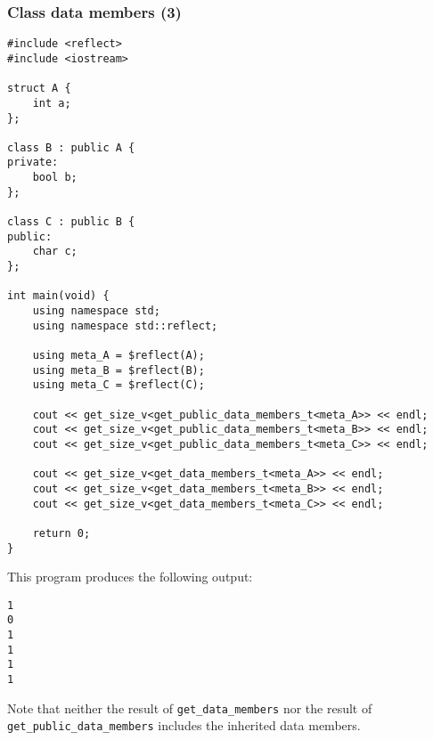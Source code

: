 \subsubsection{Class data members (3)}

\begin{verbatim}
#include <reflect>
#include <iostream>

struct A {
	int a;
};

class B : public A {
private:
	bool b;
};

class C : public B {
public:
	char c;
};

int main(void) {
	using namespace std;
	using namespace std::reflect;

	using meta_A = $reflect(A);
	using meta_B = $reflect(B);
	using meta_C = $reflect(C);

	cout << get_size_v<get_public_data_members_t<meta_A>> << endl;
	cout << get_size_v<get_public_data_members_t<meta_B>> << endl;
	cout << get_size_v<get_public_data_members_t<meta_C>> << endl;

	cout << get_size_v<get_data_members_t<meta_A>> << endl;
	cout << get_size_v<get_data_members_t<meta_B>> << endl;
	cout << get_size_v<get_data_members_t<meta_C>> << endl;

	return 0;
}
\end{verbatim}

This program produces the following output:

\begin{verbatim}
1
0
1
1
1
1
\end{verbatim}

Note that neither the result of \texttt{get\_data\_members} nor the result of
\texttt{get\_public\_data\_members} includes the inherited data members.
